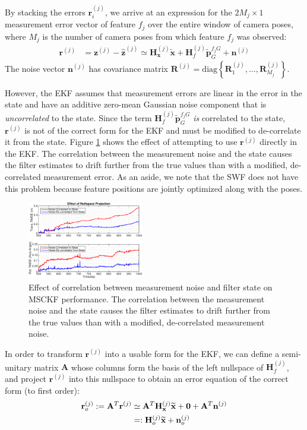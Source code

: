 \documentclass[letterpaper, 10 pt, conference]{ieeeconf}  %
\def\Vec#1{\mathbf{#1}}
\begin{document}
By stacking the errors $\Vec{r}_i^{(j)}$, we arrive at an expression for the $2M_j \times 1$ measurement error vector of feature $f_j$ over the entire window of camera poses, where $M_j$ is the number of camera poses from which feature $f_j$ was observed:
\begin{align} \label{eq:residual_stacked}
    \Vec{r}^{(j)} &= \Vec{z}^{(j)} - \hat{\Vec{z}}^{(j)} \simeq \Vec{H}_{\Vec{x}}^{(j)} \widetilde{\Vec{x}} + \Vec{H}_{f}^{(j)} \widetilde{\Vec{p}}_G^{f_j G} + \Vec{n}^{(j)}
\end{align}
The noise vector $\Vec{n}^{(j)}$ has covariance matrix $\Vec{R}^{(j)} = \text{diag}\left\{\Vec{R}_1^{(j)}, \hdots, \Vec{R}_{M_j}^{(j)}\right\}$.

However, the EKF assumes that measurement errors are linear in the error in the state and have an additive zero-mean Gaussian noise component that is \textit{uncorrelated} to the state.
Since the term $\Vec{H}_{f}^{(j)} \widetilde{\Vec{p}}_G^{f_j G}$ \textit{is} correlated to the state, $\Vec{r}^{(j)}$ is not of the correct form for the EKF and must be modified to de-correlate it from the state.
Figure \ref{fig:nullspace} shows the effect of attempting to use $\Vec{r}^{(j)}$ directly in the EKF.
The correlation between the measurement noise and the state causes the filter estimates to drift further from the true values than with a modified, de-correlated measurement error.
As an aside, we note that the SWF does not have this problem because feature positions are jointly optimized along with the poses.

\begin{figure}
    \centering
    \includegraphics[width=0.45\textwidth]{figs/NST_RMSE}    
    \caption{Effect of correlation between measurement noise and filter state on MSCKF performance. The correlation between the measurement noise and the state causes the filter estimates to drift further from the true values than with a modified, de-correlated measurement noise.}
    \label{fig:nullspace}
\end{figure}

In order to transform $\Vec{r}^{(j)}$ into a usable form for the EKF, we can define a semi-unitary matrix $\Vec{A}$ whose columns form the basis of the left nullspace of $\Vec{H}_{f}^{(j)}$, and project $\Vec{r}^{(j)}$ into this nullspace to obtain an error equation of the correct form (to first order):
\begin{align}
    \Vec{r}_o^{(j)} := \Vec{A}^T \Vec{r}^{(j)} 
                    &\simeq \Vec{A}^T \Vec{H}_{\Vec{x}}^{(j)} \widetilde{\Vec{x}} + \Vec{0} + \Vec{A}^T \Vec{n}^{(j)} \notag \\
                    &=: \Vec{H}_{o}^{(j)} \widetilde{\Vec{x}} + \Vec{n}_o^{(j)}
\end{align}
\end{document}
